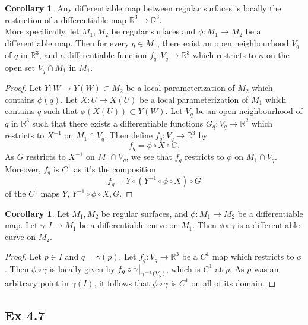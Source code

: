 \documentclass{article}
\newcommand\restr[2]{{%
  \left.\kern-\nulldelimiterspace %
  #1 %
  \vphantom{\big|} %
  \right|_{#2} %
  }}
\theoremstyle{definition}
\newtheorem{corollary}[theorem]{Corollary}
\newcommand{\R}{\mathbb{R}}
\begin{document}
\begin{corollary}
	Any differentiable map between regular surfaces is locally the restriction
	of a differentiable map $\R^3 \to \R^3$. \\

	More specifically, let $M_1, M_2$ be regular surfaces and $\phi : M_1 \to
	M_2$ be a differentiable map. Then for every $q \in M_1$, there exist an
	open neighbourhood $V_q$ of $q$ in $\R^3$, and a differentiable function
	$f_q : V_q \to \R^3$ which restricts to $\phi$ on the open set $V_q \cap
	M_1$ in $M_1$.
\end{corollary}
\begin{proof}
	Let $Y : W \to Y(W) \subset M_2$ be a local parameterization of $M_2$ which
	contains $\phi(q)$. Let $X : U \to X(U)$ be a local parameterization of
	$M_1$ which contains $q$ such that $\phi(X(U)) \subset Y(W)$. Let $V_q$ be
	an open neighbourhood of $q$ in $\R^3$ such that there exists a
	differentiable functions $G_q : V_{q} \to \R^{2}$ which restricts to
	$X^{-1}$ on $M_1 \cap V_q$. Then define $f_{q} : V_q \to \R^3$ by
	\[
		f_q
		=
		\phi
		\circ
		X
		\circ
		G.
	\] 
	As $G$ restricts to $X^{-1}$ on $M_1 \cap V_q$, we see that $f_q$ restricts to
	$\phi$ on $M_1 \cap V_q$. Moreover, $f_q$ is $C^1$ as it's the composition
	\[
		f_q
		=
		Y
		\circ
		\left(Y^{-1}
		\circ
		\phi
		\circ
		X\right)
		\circ
		G
	\] 
	of the $C^1$ maps $Y,\, Y^{-1} \circ \phi \circ X, G$.
\end{proof}

\begin{corollary}

	Let $M_1, M_2$ be regular surfaces, and $\phi : M_1 \to M_2$ be a
	differentiable map. Let $\gamma : I \to M_1$ be a differentiable curve on
	$M_1$. Then $\phi \circ \gamma$ is a differentiable
	curve on $M_2$.

\end{corollary}
\begin{proof}

	Let $p \in I$ and $q = \gamma(p)$. Let $f_q : V_q \to \R^3$ be a $C^1$ map
	which restricts to $\phi$. Then $\phi \circ \gamma$ is locally given by
	$f_q \circ \restr{\gamma}{\gamma^{-1}(V_q)}$, which is $C^1$ at $p$. As $p$
	was an arbitrary point in $\gamma(I)$, it follows that $\phi \circ \gamma$
	is $C^1$ on all of its domain.

\end{proof}

\subsection*{Ex 4.7}
\end{document}
